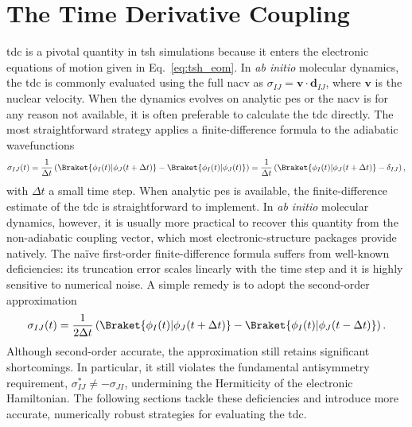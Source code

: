 \section{The Time Derivative Coupling}\label{sec:time_derivative_coupling}
\acrshort{tdc} is a pivotal quantity in \acrshort{tsh} simulations because it enters the electronic equations of motion given in Eq.~\eqref{eq:tsh_eom}. In \textit{ab initio} molecular dynamics, the \acrshort{tdc} is commonly evaluated using the full \acrshort{nacv} as $\sigma_{IJ}=\symbf{v}\cdot\symbf{d}_{IJ}$, where $\symbf{v}$ is the nuclear velocity. When the dynamics evolves on analytic \acrshort{pes} or the \acrshort{nacv} is for any reason not available, it is often preferable to calculate the \acrshort{tdc} directly. The most straightforward strategy applies a finite-difference formula to the adiabatic wavefunctions
\begin{equation}\label{eq:tdc_fd1}
\sigma_{IJ}(t)=\frac{1}{\Delta t}\left(\Braket{\phi_I(t)\vert\phi_J(t+\Delta t)}-\Braket{\phi_I(t)\vert\phi_J(t)}\right)=\frac{1}{\Delta t}\left(\Braket{\phi_I(t)\vert\phi_J(t+\Delta t)}-\delta_{IJ}\right),
\end{equation}
with $\Delta t$ a small time step. When analytic \acrshort{pes} is available, the finite-difference estimate of the \acrshort{tdc} is straightforward to implement. In \textit{ab initio} molecular dynamics, however, it is usually more practical to recover this quantity from the non-adiabatic coupling vector, which most electronic-structure packages provide natively. The naïve first-order finite-difference formula suffers from well-known deficiencies: its truncation error scales linearly with the time step and it is highly sensitive to numerical noise. A simple remedy is to adopt the second-order approximation
\begin{equation}\label{eq:tdc_fd2}
\sigma_{IJ}(t)=\frac{1}{2\Delta t}\left(\Braket{\phi_I(t)\vert\phi_J(t+\Delta t)}-\Braket{\phi_I(t)\vert\phi_J(t-\Delta t)}\right).
\end{equation}
Although second-order accurate, the approximation still retains significant shortcomings. In particular, it still violates the fundamental antisymmetry requirement, $\sigma_{IJ}^\ast\neq-\sigma_{JI}$, undermining the Hermiticity of the electronic Hamiltonian. The following sections tackle these deficiencies and introduce more accurate, numerically robust strategies for evaluating the \acrshort{tdc}.
